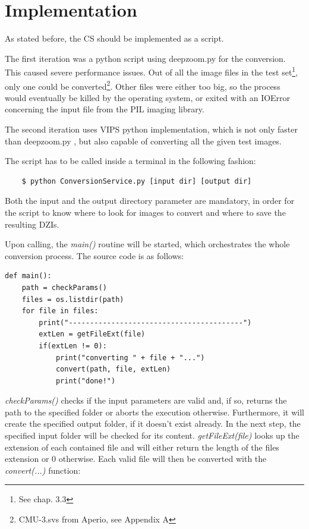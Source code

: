 \section{Implementation}

As stated before, the CS should be implemented as a script.

The first iteration was a python script using deepzoom.py for the conversion. This caused severe performance issues. Out of all the image files in the test set\footnote{See chap. 3.3}, only one could be converted\footnote{CMU-3.svs from Aperio, see Appendix A}. Other files were either too big, so the process would eventually be killed by the operating system, or exited with an IOError concerning the input file from the PIL imaging library.

The second iteration uses VIPS python implementation, which is not only faster than deepzoom.py , but also capable of converting all the given test images.

The script has to be called inside a terminal in the following fashion:

\begin{lstlisting}
	$ python ConversionService.py [input dir] [output dir]
\end{lstlisting}

Both the input and the output directory parameter are mandatory, in order for the script to know where to look for images to convert and where to save the resulting DZIs.

Upon calling, the \emph{main()} routine will be started, which orchestrates the whole conversion process. The source code is as follows:

\begin{lstlisting}[frame=single]
def main():
	path = checkParams()
	files = os.listdir(path)
	for file in files:
		print("-----------------------------------------")
		extLen = getFileExt(file)
		if(extLen != 0):
			print("converting " + file + "...")
			convert(path, file, extLen)
			print("done!")
\end{lstlisting}

\emph{checkParams()} checks if the input parameters are valid and, if so, returns the path to the specified folder or aborts the execution otherwise. Furthermore, it will create the specified output folder, if it doesn't exist already. In the next step, the specified input folder will be checked for its content. \emph{getFileExt(file)} looks up the extension of each contained file and will either return the length of the files extension or $0$ otherwise. Each valid file will then be converted with the \emph{convert(...)} function:

